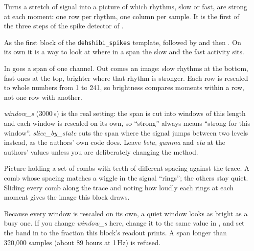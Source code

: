 Turns a stretch of signal into a picture of which rhythms, slow or fast, are strong at each
moment: one row per rhythm, one column per sample. It is the first of the three steps of
the spike detector of \citet{dehshibi2021electrical}.

As the first block of the \texttt{dehshibi\_spikes} template, followed by
 and then .
On its own it is a way to look at where in a span the slow and the fast activity sits.

In goes a span of one channel. Out comes an image: slow rhythms at the bottom, fast ones at
the top, brighter where that rhythm is stronger. Each row is rescaled to whole numbers from
1 to 241, so brightness compares moments within a row, not one row with another.

\emph{window\_s} (3000\,s) is the real setting: the span is cut into windows of this length
and each window is rescaled on its own, so ``strong'' always means ``strong for this
window''. \emph{slice\_by\_state} cuts the span where the signal jumps between two levels
instead, as the authors' own code does. Leave \emph{beta}, \emph{gamma} and \emph{eta} at
the authors' values unless you are deliberately changing the method.

\begin{plainterms}
Picture holding a set of combs with teeth of different spacing against the trace. A comb
whose spacing matches a wiggle in the signal ``rings''; the others stay quiet. Sliding every
comb along the trace and noting how loudly each rings at each moment gives the image this
block draws.
\end{plainterms}

Because every window is rescaled on its own, a quiet window looks as bright as a busy one.
If you change \emph{window\_s} here, change it to the same value in
, and set the band in
 to the fraction this block's readout prints. A span
longer than 320{,}000 samples (about 89 hours at 1\,Hz) is refused.
